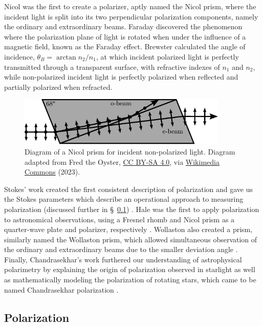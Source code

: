 Nicol was the first to create a polarizer, aptly named the Nicol prism, where the incident light is split into its two perpendicular polarization components, namely the ordinary and extraordinary beams. Faraday discovered the phenomenon where the polarization plane of light is rotated when under the influence of a magnetic field, known as the Faraday effect. Brewster calculated the angle of incidence, $\theta_{B} = \arctan{n_{2} / n_{1}}$, at which incident polarized light is perfectly transmitted through a transparent surface, with refractive indexes of $n_{1}$ and $n_{2}$, while non-polarized incident light is perfectly polarized when reflected and partially polarized when refracted.

\begin{figure}[t]
    \centering
    \includegraphics[width=10cm]{figures/2_Nicol_prism.pdf}
    \caption{Diagram of a Nicol prism for incident non-polarized light. Diagram adapted from Fred the Oyster, \protect\href{https://creativecommons.org/licenses/by-sa/4.0/}{CC BY-SA 4.0}, via \protect\href{https://en.m.wikipedia.org/wiki/File:Nicol_prism.svg}{Wikimedia Commons} (2023).}
    \label{fig:Nicol_prism}
\end{figure}

Stokes' work created the first consistent description of polarization and gave us the Stokes parameters which describe an operational approach to measuring polarization (discussed further in \S~\ref{subsec:pol}) \citep{Stokes}. Hale was the first to apply polarization to astronomical observations, using a Fresnel rhomb and Nicol prism as a quarter-wave plate and polarizer, respectively \citep{Hale_pre,Hale_post}. Wollaston also created a prism, similarly named the Wollaston prism, which allowed simultaneous observation of the ordinary and extraordinary beams due to the smaller deviation angle \citep{WollPrism}. Finally, Chandrasekhar's work furthered our understanding of astrophysical polarimetry by explaining the origin of polarization observed in starlight as well as mathematically modeling the polarization of rotating stars, which came to be named Chandrasekhar polarization \citep{chandrasekhar}.

\subsection{Polarization}\label{subsec:pol}

